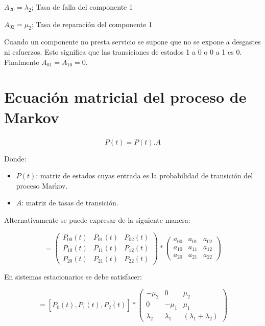 \documentclass[
    11pt,
    spanish,
    a4paper
]{article}
\begin{document}
$ A_{20} = \lambda_2$; Tasa de falla del componente 1

$ A_{02} = \mu_2$; Tasa de reparación del componente 1

Cuando un componente no presta servicio se supone que no se expone a desgastes ni esfuerzos.
Esto significa que las transiciones de estados 1 a 0 o 0 a 1 es 0.
Finalmente $ A_{01} = A_{10} = 0 $.

\section{Ecuación matricial del proceso de Markov}

$$ \dot{P(t)} = P(t) . A $$

Donde:
\begin{itemize}
	\item $ P(t) $: matriz de estados cuyas entrada es la probabilidad de transición del proceso Markov.
	\item $ A $: matriz de tasas de transición.
\end{itemize}

Alternativamente se puede expresar de la siguiente manera:

\begin{equation}
	[\dot{P_0(t)},\dot{P_1(t)},\dot{P_2(t)}] =
	\begin{pmatrix}
		P_{00}(t) & P_{01}(t) & P_{02}(t) \\
		P_{10}(t) & P_{11}(t) & P_{12}(t) \\
		P_{20}(t) & P_{21}(t) & P_{22}(t)
	\end{pmatrix} *
	\begin{pmatrix}
		a_{00} & a_{01} & a_{02} \\
		a_{10} & a_{11} & a_{12} \\
		a_{20} & a_{21} & a_{22}
	\end{pmatrix}
\end{equation}

En sistemas estacionarios se debe satisfacer:

\begin{equation}
	[0,0,0] = [\dot{P_0(t)},\dot{P_1(t)},\dot{P_2(t)}] *
	\begin{pmatrix}
		-\mu_2    & 0         & \mu_2                   \\
		0         & -\mu_1    & \mu_1                   \\
		\lambda_2 & \lambda_1 & (\lambda_1 + \lambda_2)
	\end{pmatrix}
\end{equation}
\end{document}
